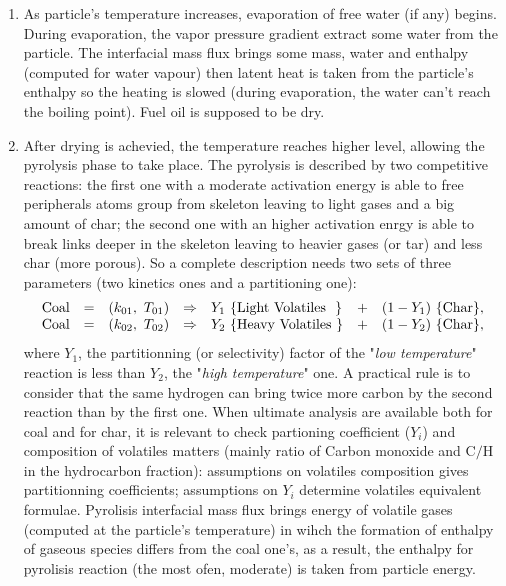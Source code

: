\begin{enumerate}
\item As particle's temperature increases, evaporation of free water (if any)
  begins. During evaporation, the vapor pressure gradient extract some water
  from the particle. The interfacial mass flux brings some mass, water and
  enthalpy (computed for water vapour) then latent heat is taken from the
  particle's enthalpy so the heating is slowed (during evaporation, the water
  can't reach the boiling point). Fuel oil is supposed to be dry.
\item After drying is achevied, the temperature reaches higher level, allowing
  the pyrolysis phase to take place. The pyrolysis is described by two
  competitive reactions: the first one with a moderate activation energy is
  able to free peripherals atoms group from skeleton leaving to light gases and
  a big amount of char; the second one with an higher activation enrgy is able
  to break links deeper in the skeleton leaving to heavier gases (or tar) and
  less char (more porous). So a complete description needs two sets of three
  parameters (two kinetics ones and a partitioning one):
\begin{equation*}
\begin{array}{r c l c l c l}
\mbox{Coal} &=&(k_{01},~ T_{01}) &\Rightarrow& Y_1~\{\mbox{Light Volatiles~~}\} &+& (1-Y_1)~\{ \mbox{Char} \}, \\
\mbox{Coal} &=&(k_{02},~ T_{02}) &\Rightarrow& Y_2~\{\mbox{Heavy Volatiles~} \} &+& (1-Y_2)~\{ \mbox{Char} \},
\end{array}
\end{equation*}
where $Y_1$, the partitionning (or selectivity) factor of the "\emph{low
  temperature}" reaction is less than $Y_2$, the "\emph{high temperature}" one.
A practical rule is to consider that the same hydrogen can bring twice more
carbon by the second reaction than by the first one. When ultimate analysis are
available both for coal and for char, it is relevant to check partioning
coefficient ($Y_{i}$) and composition of volatiles matters (mainly ratio of
Carbon monoxide and C$/$H in the hydrocarbon fraction): assumptions on
volatiles composition gives partitionning coefficients; assumptions on $Y_{i}$
determine volatiles equivalent formulae. Pyrolisis interfacial mass flux brings
energy of volatile gases (computed at the particle's temperature) in wihch the
formation of enthalpy of gaseous species differs from the coal one's, as a
result, the enthalpy for pyrolisis reaction (the most ofen, moderate) is taken
from particle energy.


\end{enumerate}
